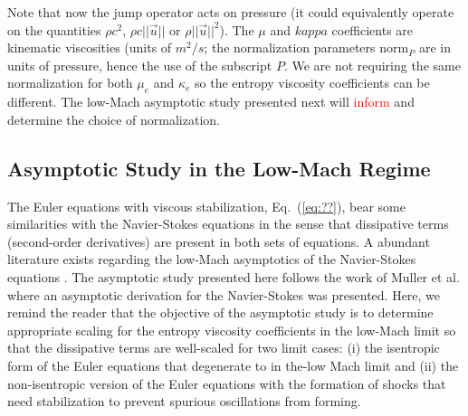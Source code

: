 \documentclass[preprint,10pt]{elsarticle}
\newcommand{\norm}{\textrm{norm}}
\newcommand{\eqt}[1]{Eq.~(\ref{#1})}                     %
\newcommand{\sct}[1]{Section~\ref{#1}}                   %
\newcommand{\tcr}[1]{\textcolor{red}{#1}}
\begin{document}
%
Note that now the jump operator acts on pressure (it could equivalently operate on the quantities $\rho c^2$, $\rho c || \vec{u} ||$ or $\rho || \vec{u} ||^2$). The $\mu$ and $kappa$ coefficients are kinematic viscosities (units of $m^2/s$; the normalization parameters $\norm_P$ are in units of pressure, hence the use of the subscript $P$.  We are not requiring the same normalization for both $\mu_e$ and $\kappa_e$ so the entropy viscosity coefficients can be different. The low-Mach asymptotic study presented next will \tcr{inform} and determine the choice of normalization.


\subsection{Asymptotic Study in the Low-Mach Regime} \label{sec:lowMach}

The Euler equations with viscous stabilization, \eqt{eq:??}, bear some similarities with the Navier-Stokes equations in the sense that dissipative terms (second-order derivatives) are present in both sets of equations. A abundant literature exists regarding the low-Mach asymptotics of the Navier-Stokes equations \cite{LowMach1, LowMach2, LowMach3, Muller}.   
%
The asymptotic study presented here follows the work of Muller et al. \cite{Muller} where an asymptotic derivation for the Navier-Stokes  was presented. Here, we remind the reader that the objective of the asymptotic study is to determine appropriate scaling for the entropy viscosity coefficients in the low-Mach limit so that the dissipative terms are well-scaled for two limit cases: (i) the isentropic form of the Euler equations that degenerate to  in the-low Mach limit and (ii) the non-isentropic version of the Euler equations with the formation of shocks that need stabilization to prevent spurious oscillations from forming.
\end{document}
